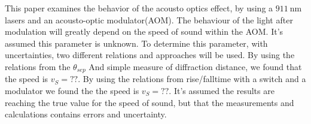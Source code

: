 \documentclass[main]{subfiles}
\begin{document}
This paper examines the behavior of the acousto optics effect, by using a $\SI{911}{\nano\meter}$ lasers and  an acousto-optic modulator(AOM). The behaviour of the light after modulation will greatly depend on the speed of sound within the AOM. It’s assumed this parameter is unknown. To determine this parameter, with uncertainties, two different relations and approaches will be used. By using the relations from the $\theta_{sep}$ And simple measure of diffraction distance, we found that the speed is $v_S = ??$. By using the relations from rise/falltime with a switch and a modulator we found the the speed is $v_S = ??$. It’s assumed the results are reaching the true value for the speed of sound, but that the measurements and calculations contains errors and uncertainty.
\end{document}
